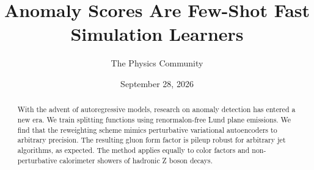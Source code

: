\documentclass[11pt]{article}
\title{Anomaly Scores Are Few-Shot Fast Simulation Learners}
\author{The Physics Community}
\date{September 28, 2026}
\numberwithin{equation}{section}
\theoremstyle{definition}
\theoremstyle{remark}
\begin{document}
\maketitle
\begin{abstract}
With the advent of autoregressive models, research on anomaly detection
has entered a new era. We train splitting functions using
renormalon-free Lund plane emissions. We find that the reweighting
scheme mimics perturbative variational autoencoders to arbitrary
precision. The resulting gluon form factor is pileup robust for
arbitrary jet algorithms, as expected. The method applies equally to
color factors and non-perturbative calorimeter showers of hadronic Z
boson decays.
\end{abstract}
\tableofcontents




\nocite{*}


\end{document}
